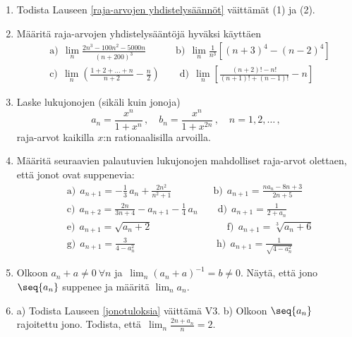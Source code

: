 \Harj
\begin{enumerate}

\item \label{H-I-7: todistuksia}
Todista Lauseen \ref{raja-arvojen yhdistelysäännöt} väittämät (1) ja (2).

\item
Määritä raja-arvojen yhdistelysääntöjä hyväksi käyttäen
\begin{align*}
&\text{a)}\ \ \lim_n \frac{2n^3-100n^2-5000n}{(n+200)^3} \qquad\quad
 \text{b)}\ \ \lim_n \frac{1}{n^3}\left[(n+3)^4-(n-2)^4\right] \\
&\text{c)}\ \ \lim_n \left(\frac{1+2+ \ldots +n}{n+2}-\frac{n}{2}\right) \qquad 
 \text{d)}\ \ \lim_n \left[\frac{(n+2)!-n!}{(n+1)!+(n-1)!}-n\right]
\end{align*}

\item 
Laske lukujonojen (sikäli kuin jonoja)
\[
a_n=\frac{x^n}{1+x^n}\,, \quad b_n=\frac{x^n}{1+x^{2n}}\,, \quad n=1,2, \ldots\,, 
\]
raja-arvot kaikilla $x$:n rationaalisilla arvoilla.

\item \label{H-I-7: sqrt-kunta}
Määritä seuraavien palautuvien lukujonojen mahdolliset raja-arvot olettaen, että
jonot ovat suppenevia:
\begin{align*}
&\text{a)}\ \ a_{n+1}=-\frac{1}{3}\,a_n+\frac{2n^2}{n^2+1} \qquad\qquad\
 \text{b)}\ \ a_{n+1} = \frac{na_n-8n+3}{2n+5} \\
&\text{c)}\ \ a_{n+2} = \frac{2n}{3n+4} - a_{n+1} - \frac{1}{4}\,a_n \qquad
 \text{d)}\ \ a_{n+1} = \frac{1}{2+a_n} \\[2mm]
&\text{e)}\ \ a_{n+1} = \sqrt{a_n+2} \qquad\qquad\qquad\quad\,\ \
 \text{f)}\ \ a_{n+1} = \sqrt[3]{a_n+6} \\[2mm]
&\text{g)}\ \ a_{n+1} = \frac{3}{4-a_n^2} \qquad\qquad\qquad\qquad\
 \text{h)}\ \ a_{n+1} = \frac{1}{\sqrt{4-a_n^2}}
\end{align*}

\item 
Olkoon $a_n+a \neq 0\ \forall n$ ja $\,\lim_n (a_n+a)^{-1} = b \neq 0$. Näytä, että jono 
$\seq{a_n}$ suppenee ja määritä $\lim_n a_n$.

\item \label{H-I-7: jonotulos 3}
a) Todista Lauseen \ref{jonotuloksia} väittämä V3. \vspace{1mm}\newline
b) Olkoon $\seq{a_n}$ rajoitettu jono. Todista, että 
   $\displaystyle{\,\lim_n \frac{2n+a_n}{n}=2}$.


\end{enumerate}
